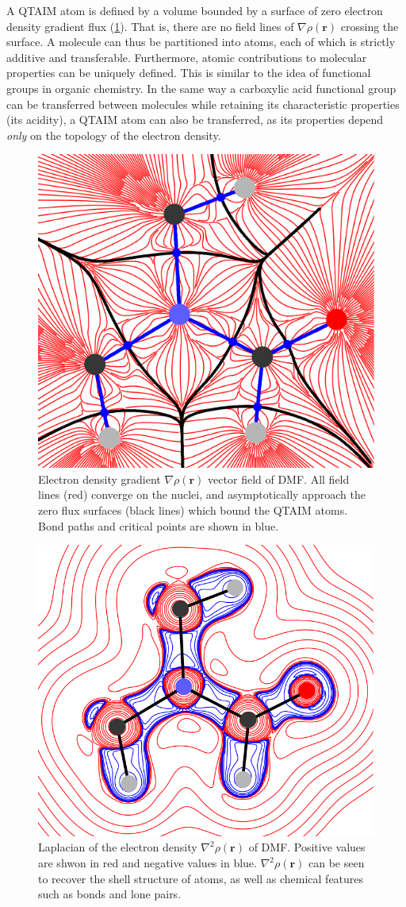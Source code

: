 \begin{refsection}
A QTAIM atom is defined by a volume bounded by a surface of zero electron density gradient flux (\cref{fig:dmf-gradient}).
That is, there are no field lines of $\nabla\rho(\textbf{r})$ crossing the surface.
A molecule can thus be partitioned into atoms, each of which is strictly additive and transferable.
Furthermore, atomic contributions to molecular properties can be uniquely defined.
This is similar to the idea of functional groups in organic chemistry.
In the same way a carboxylic acid functional group can be transferred between molecules while retaining its characteristic properties (its acidity), a QTAIM atom can also be transferred, as its properties depend \emph{only} on the topology of the electron density.

\begin{figure}
    \includegraphics[width=0.48\linewidth]{Figures/dmf-grad.pdf}
    \caption[Electron density gradient $\nabla\rho(\textbf{r})$ vector field of DMF.]{Electron density gradient $\nabla\rho(\textbf{r})$ vector field of DMF. All field lines (red) converge on the nuclei, and asymptotically approach the zero flux surfaces (black lines) which bound the QTAIM atoms. Bond paths and critical points are shown in blue.}
    \label{fig:dmf-gradient}
\end{figure}

\begin{figure}
    \includegraphics[width=0.48\linewidth]{Figures/dmf-lapl.pdf}
    \caption[Laplacian of the electron density $\nabla^{2}\rho(\textbf{r})$ of DMF.]{Laplacian of the electron density $\nabla^{2}\rho(\textbf{r})$ of DMF. Positive values are shwon in red and negative values in blue. $\nabla^{2}\rho(\textbf{r})$ can be seen to recover the shell structure of atoms, as well as chemical features such as bonds and lone pairs.}
    \label{fig:dmf-lapl}
\end{figure}


\end{refsection}
